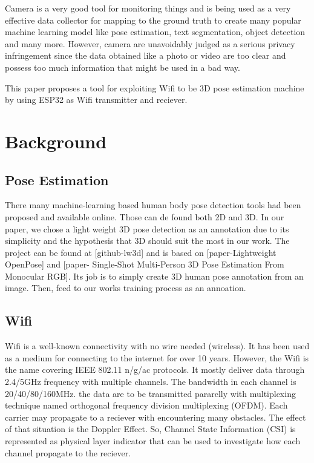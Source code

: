 \documentclass[conference]{IEEEtran}
\begin{document}
		 Camera is a very good tool for monitoring things and is being used as a very effective data collector for mapping to the ground truth to create many popular machine learning model like pose estimation, text segmentation, object detection and many  more. However, camera are unavoidably judged as a serious privacy infringement since the data obtained like a photo or video are too clear and possess too much information that might be used in a bad way.
		 
		 
		 
		 
		 
		  This paper proposes a tool for exploiting Wifi to be 3D pose estimation machine by using ESP32 as Wifi transmitter and reciever.
	
	
	\section{Background}
	
	\subsection{Pose Estimation}
	
	There many machine-learning based human body pose detection tools had been proposed and available online. Those can de found both 2D and 3D. In our paper, we chose a light weight 3D pose detection as an annotation due to its simplicity and the hypothesis that 3D should suit the most in our work. The project can be found at [github-lw3d] and is based on [paper-Lightweight OpenPose] and [paper- Single-Shot Multi-Person 3D Pose Estimation From Monocular RGB]. Its job is to simply create 3D human pose annotation from an image. Then, feed to our works training process as an annoation.
	
	
	\subsection{Wifi}\label{wifi}
	
	Wifi is a well-known connectivity with no wire needed (wireless). It has been used as a medium for connecting to the internet for over 10 years. However, the Wifi is the name covering IEEE 802.11 n/g/ac protocols. It mostly deliver data through 2.4/5GHz frequency with multiple channels. The bandwidth in  each channel is 20/40/80/160MHz. the data are to be transmitted  pararelly with multiplexing technique named orthogonal frequency division multiplexing (OFDM). Each carrier may propagate to a reciever with encountering many obstacles. The effect of that situation is the Doppler Effect.
	So, Channel State Information (CSI) is represented as physical layer indicator that can be used to investigate how each channel propagate to the reciever.
	
\end{document}

